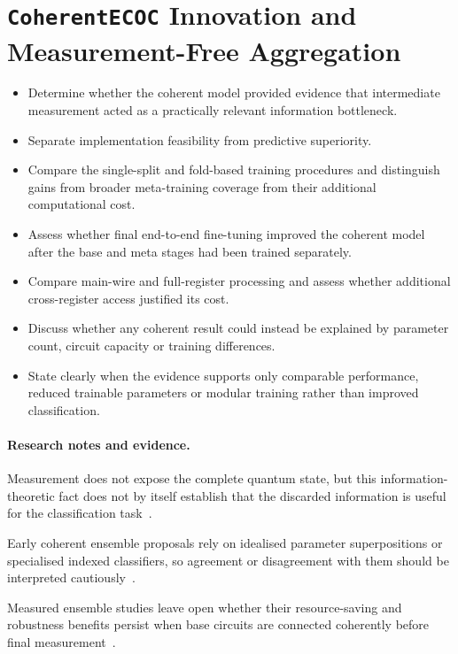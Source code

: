 \documentclass[]{UCD_CS_MSc_AAI_Report}
\newcommand{\limitation}[1]{{\color{orange}#1}}
\newcommand{\theory}[1]{{\color{gray}#1}}
\newcommand{\gap}[1]{{\color{black}#1}}
\newcommand{\researchnotes}{\paragraph{Research notes and evidence.}}
\begin{document}
\section{\texttt{CoherentECOC} Innovation and Measurement-Free Aggregation}
\label{sec:discussion-coherent}
\begin{itemize}
    \item Determine whether the coherent model provided evidence that intermediate measurement acted as a practically relevant information bottleneck.
    \item Separate implementation feasibility from predictive superiority.
    \item Compare the single-split and fold-based training procedures and distinguish gains from broader meta-training coverage from their additional computational cost.
    \item Assess whether final end-to-end fine-tuning improved the coherent model after the base and meta stages had been trained separately.
    \item Compare main-wire and full-register processing and assess whether additional cross-register access justified its cost.
    \item Discuss whether any coherent result could instead be explained by parameter count, circuit capacity or training differences.
    \item State clearly when the evidence supports only comparable performance, reduced trainable parameters or modular training rather than improved classification.
\end{itemize}

\researchnotes
\begin{itemize}
    \theory{\item Measurement does not expose the complete quantum state, but this information-theoretic fact does not by itself establish that the discarded information is useful for the classification task~\cite{resch_quantum_2019}.}
    \limitation{\item Early coherent ensemble proposals rely on idealised parameter superpositions or specialised indexed classifiers, so agreement or disagreement with them should be interpreted cautiously~\cite{schuld_quantum_2018,tolotti_weighted_2025}.}
    \gap{\item Measured ensemble studies leave open whether their resource-saving and robustness benefits persist when base circuits are connected coherently before final measurement~\cite{incudini_resource_2023}.}
\end{itemize}
\end{document}
